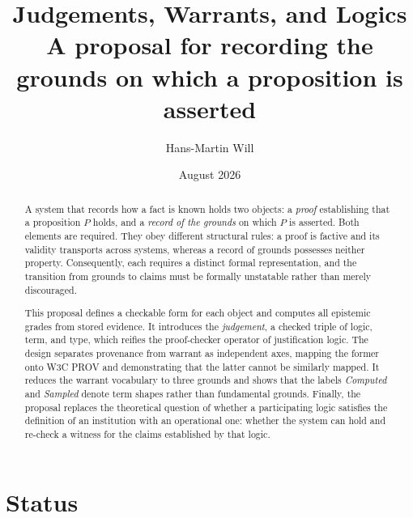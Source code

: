 \documentclass[manuscript,nonacm=true]{acmart}
\begin{document}
\title[Judgements, Warrants, and Logics]{Judgements, Warrants, and Logics\\[0.5em]
\large A proposal for recording the grounds on which a proposition is asserted}
\author{Hans-Martin Will}
\renewcommand{\shortauthors}{Will}
\date{August 2026}

\begin{abstract}
A system that records how a fact is known holds two objects: a \emph{proof} establishing that a proposition $P$ holds, and a \emph{record of the grounds} on which $P$ is asserted. Both elements are required. They obey different structural rules: a proof is factive and its validity transports across systems, whereas a record of grounds possesses neither property. Consequently, each requires a distinct formal representation, and the transition from grounds to claims must be formally unstatable rather than merely discouraged.

This proposal defines a checkable form for each object and computes all epistemic grades from stored evidence. It introduces the \emph{judgement}, a checked triple of logic, term, and type, which reifies the proof-checker operator of justification logic. The design separates provenance from warrant as independent axes, mapping the former onto W3C PROV and demonstrating that the latter cannot be similarly mapped. It reduces the warrant vocabulary to three grounds and shows that the labels \emph{Computed} and \emph{Sampled} denote term shapes rather than fundamental grounds. Finally, the proposal replaces the theoretical question of whether a participating logic satisfies the definition of an institution with an operational one: whether the system can hold and re-check a witness for the claims established by that logic.
\end{abstract}

\maketitle


\section*{Status}
\end{document}
